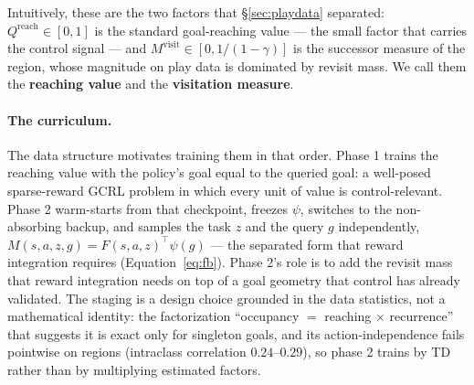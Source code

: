\documentclass{article}
\newcommand{\Reach}{\mathrm{reach}}
\newcommand{\Visit}{\mathrm{visit}}
\begin{document}
Intuitively, these are the two factors that \S\ref{sec:playdata} separated:
$Q^{\Reach}\in[0,1]$ is the standard goal-reaching value --- the small factor
that carries the control signal --- and $M^{\Visit}\in[0,1/(1-\gamma)]$ is the
successor measure of the region, whose magnitude on play data is dominated by
revisit mass. We call them the \textbf{reaching value} and the
\textbf{visitation measure}.

\paragraph{The curriculum.}
The data structure motivates training them in that order. Phase 1 trains the
reaching value with the policy's goal equal to the queried goal: a well-posed
sparse-reward GCRL problem in which every unit of value is control-relevant.
Phase 2 warm-starts from that checkpoint, freezes $\psi$, switches to the
non-absorbing backup, and samples the task $z$ and the query $g$
independently, $M(s,a,z,g)=F(s,a,z)^{\top}\psi(g)$ --- the separated form that
reward integration requires (Equation~\ref{eq:fb}). Phase 2's role is to add
the revisit mass that reward integration needs on top of a goal geometry that
control has already validated. The staging is a design choice grounded in the
data statistics, not a mathematical identity: the factorization
``occupancy $=$ reaching $\times$ recurrence'' that suggests it is exact only
for singleton goals, and its action-independence fails pointwise on regions
(intraclass correlation $0.24$--$0.29$), so phase 2 trains by TD rather than by
multiplying estimated factors.
\end{document}
